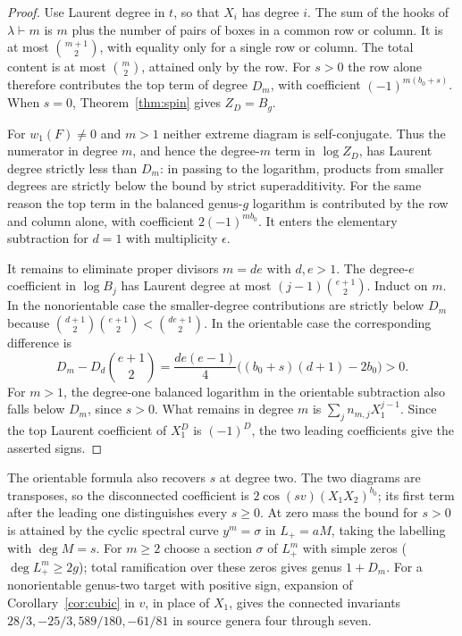 \begin{proof}
Use Laurent degree in \(t\), so that \(X_i\) has degree \(i\).
The sum of the hooks of \(\lambda\vdash m\) is \(m\) plus the number
of pairs of boxes in a common row or column. It is at most
\(\binom{m+1}2\), with equality only for a single row or column.
The total content is at most \(\binom m2\), attained only by the
row. For \(s>0\) the row alone therefore contributes the top term
of degree \(D_m\), with coefficient \((-1)^{m(b_0+s)}\).
When \(s=0\), Theorem~\ref{thm:spin} gives \(Z_D=B_g\).

For \(w_1(F)\ne0\) and \(m>1\) neither extreme diagram is
self-conjugate. Thus the numerator in degree \(m\), and hence the
degree-\(m\) term in \(\log Z_D\), has Laurent degree strictly less
than \(D_m\): in passing to the logarithm, products from smaller
degrees are strictly below the bound by strict superadditivity.
For the same reason the top term in the balanced genus-\(g\) logarithm
is contributed by the row and column alone, with coefficient
\(2(-1)^{mb_0}\). It enters the elementary subtraction for \(d=1\)
with multiplicity \(\epsilon\).

It remains to eliminate proper divisors \(m=de\) with \(d,e>1\).
The degree-\(e\) coefficient in \(\log B_j\) has Laurent degree at
most \((j-1)\binom{e+1}2\). Induct on \(m\). In the nonorientable
case the smaller-degree contributions are strictly below \(D_m\)
because \(\binom{d+1}2\binom{e+1}2<\binom{de+1}2\).
In the orientable case the corresponding difference is
\[
 D_m-D_d\binom{e+1}2=
 \frac{de(e-1)}4\big((b_0+s)(d+1)-2b_0\big)>0.
\]
For \(m>1\), the degree-one balanced logarithm in the orientable
subtraction also falls below \(D_m\), since \(s>0\).
What remains in degree \(m\) is \(\sum_jn_{m,j}X_1^{j-1}\).
Since the top Laurent coefficient of \(X_1^D\) is \((-1)^D\),
the two leading coefficients give the asserted signs.
\end{proof}

The orientable formula also recovers \(s\) at degree two. The two
diagrams are transposes, so the disconnected coefficient is
\(2\cos(sv)(X_1X_2)^{b_0}\); its first term after the leading one
distinguishes every \(s\ge0\). At zero mass the bound for \(s>0\)
is attained by the cyclic spectral curve \(y^m=\sigma\) in
\(L_+=aM\), taking the labelling with \(\deg M=s\). For \(m\ge2\)
choose a section \(\sigma\) of \(L_+^m\) with simple zeros
(\(\deg L_+^m\ge2g\)); total ramification over these zeros gives
genus \(1+D_m\). For a nonorientable genus-two target with positive
sign, expansion of Corollary~\ref{cor:cubic} in \(v\), in place of
\(X_1\), gives the connected invariants \(28/3,-25/3,589/180,-61/81\)
in source genera four through seven.
